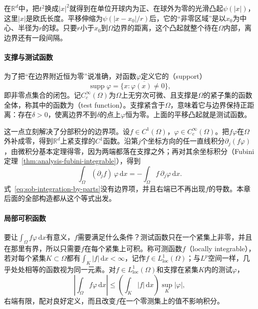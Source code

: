 在$\mathbb R^d$中，把$t^2$换成$|x|^2$就得到在单位开球内为正、在球外为零的光滑凸起$\psi(|x|)$，这里$|x|$是欧氏长度。平移伸缩为$\psi(|x-x_0|/r)$后，它的“非零区域”是以$x_0$为中心、半径为$r$的球。只要$r$小于$x_0$到$\Omega$边界的距离，这个凸起就整个待在$\Omega$内部，离边界还有一段间隔。

\paragraph{支撑与测试函数}
为了把“在边界附近恒为零”说准确，对函数$\varphi$定义它的（support）
\[
 \operatorname{supp}\varphi=\overline{\{x:\varphi(x)\neq0\}},
\]
即非零点集合的闭包。记$C_c^\infty(\Omega)$为$\Omega$上无穷次可微、且支撑是$\Omega$的紧子集的函数全体，称其中的函数为（test function）。支撑紧含于$\Omega$，意味着它与边界保持正距离：存在$\delta>0$，使离边界不到$\delta$的点上$\varphi$恒为零。上面的平移凸起就是测试函数。

这一点立刻解决了分部积分的边界项。设$f\in C^1(\Omega)$，$\varphi\in C_c^\infty(\Omega)$。把$f\varphi$在$\Omega$外补成零，得到$\mathbb R^d$上紧支撑的$C^1$函数。沿第$j$个坐标方向的任一直线积分$\partial_j(f\varphi)$，由微积分基本定理得零，因为两端都落在支撑之外；再对其余坐标积分（Fubini定理~\ref{thm:analysis-fubini-integrable}），得到
\begin{equation}
 \int_\Omega(\partial_jf)\,\varphi\,\mathrm dx=-\int_\Omega f\,\partial_j\varphi\,\mathrm dx .
 \label{eq:sob-integration-by-parts}
\end{equation}
式~\eqref{eq:sob-integration-by-parts}没有边界项，并且右端已不再出现$f$的导数。本章后面的全部构造都从这个等式出发。

\paragraph{局部可积函数}
要让$\int_\Omega f\varphi\,\mathrm dx$有意义，$f$需要满足什么条件？测试函数只在一个紧集上非零，并且在那里有界，所以只需要$f$在每个紧集上可积。称可测函数$f$（locally integrable），若对每个紧集$K\subset\Omega$都有$\int_K|f|\,\mathrm dx<\infty$，记作$f\in L^1_{\mathrm{loc}}(\Omega)$；与$L^p$空间一样，几乎处处相等的函数视为同一元素。对$f\in L^1_{\mathrm{loc}}(\Omega)$和支撑在紧集$K$内的测试$\varphi$，
\begin{equation}
 \left|\int_\Omega f\varphi\,\mathrm dx\right|\le\left(\int_K|f|\,\mathrm dx\right)\sup_K|\varphi| ,
 \label{eq:sob-local-pairing}
\end{equation}
右端有限，配对良好定义，而且改变$f$在一个零测集上的值不影响积分。


